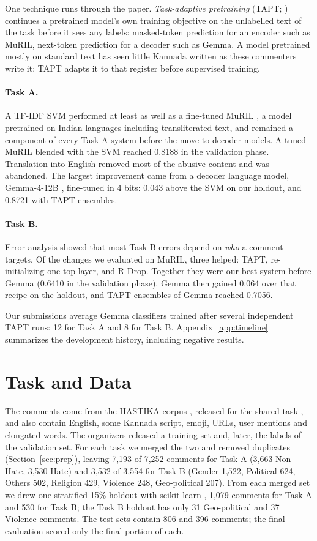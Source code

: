 \documentclass[11pt]{article}
\newcommand{\taska}{Task A}
\newcommand{\taskb}{Task B}
\begin{document}
One technique runs through the paper. \emph{Task-adaptive pretraining} (TAPT;
\citealp{gururangan-etal-2020-dont}) continues a pretrained model's own training
objective on the unlabelled text of the task before it sees any labels:
masked-token prediction for an encoder such as MuRIL, next-token prediction for a
decoder such as Gemma. A model pretrained mostly on standard text has seen little
Kannada written as these commenters write it; TAPT adapts it to that register
before supervised training.

\paragraph{\taska{}.} A TF-IDF SVM performed at least as well as a fine-tuned
MuRIL \citep{khanuja-etal-2021-muril}, a model pretrained on Indian languages
including transliterated text, and remained a component of every \taska{} system
before the move to decoder models. A tuned MuRIL blended with the SVM reached
0.8188 in the validation phase. Translation into English removed most of the
abusive content and was abandoned. The largest improvement came from a decoder
language model, Gemma-4-12B \citep{gemma-team-2026-gemma4}, fine-tuned in 4 bits:
0.043 above the SVM on our holdout, and 0.8721 with TAPT ensembles.

\paragraph{\taskb{}.} Error analysis showed that most \taskb{} errors depend on
\emph{who} a comment targets. Of the changes we
evaluated on MuRIL, three helped: TAPT, re-initializing one top layer, and R-Drop.
Together they were our best system before Gemma (0.6410 in the validation
phase). Gemma then gained 0.064 over that recipe on the holdout, and TAPT
ensembles of Gemma reached 0.7056.

Our submissions average Gemma classifiers trained after several independent
TAPT runs: 12 for \taska{} and 8 for \taskb{}. Appendix~\ref{app:timeline}
summarizes the development history, including negative results.

\section{Task and Data}
\label{sec:data}
The comments come from the HASTIKA corpus \citep{kavatagi-rachh-2025}, released
for the shared task \citep{hastika-2026-starting-kit}, and also contain English, some Kannada script, emoji, URLs, user mentions and elongated
words. The organizers released a training set and, later, the labels of the
validation set. For each task we merged the two and removed duplicates
(Section~\ref{sec:prep}), leaving 7,193 of 7,252 comments for \taska{} (3,663
Non-Hate, 3,530 Hate) and 3,532 of 3,554 for \taskb{} (Gender 1,522, Political
624, Others 502, Religion 429, Violence 248, Geo-political 207). From each merged
set we drew one stratified 15\% holdout with scikit-learn
\citep{pedregosa-etal-2011-scikit}, 1,079 comments for \taska{} and 530 for
\taskb{}; the \taskb{} holdout has only 31 Geo-political and 37 Violence
comments. The test sets contain 806 and 396 comments; the final evaluation
scored only the final portion of each.
\end{document}
